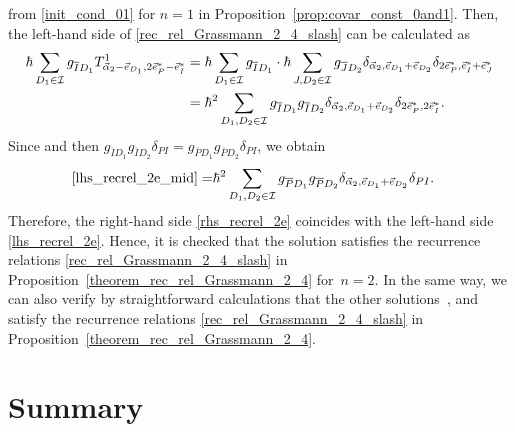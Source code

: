 \documentclass[10pt,a4paper]{amsart}
\numberwithin{equation}{section}
\begin{document}
from \eqref{init_cond_01} for $n=1$ in Proposition~\ref{prop:covar_const_0and1}. Then, the left-hand side of \eqref{rec_rel_Grassmann_2_4_slash} can be calculated as
\begin{align}
\hbar
\sum_{
D_{1}
\in
\mathcal{I}
}
g_{\overline{I}
D_{1}
}
T^{1}_{
\vec{\alpha}_{2}
-
\vec{e}_{D_{1}}
,
2
\vec{e}_{P}^{\ast}
-
\vec{e}_{I}^{\ast}
}
={}&
\hbar
\sum_{
D_{1}
\in
\mathcal{I}
}
g_{\overline{I}D_{1}}
\cdot
\hbar
\sum_{
J,D_{2}
\in
\mathcal{I}
}
g_{\overline{J}D_{2}}
\delta_{
\vec{\alpha}_{2},
\vec{e}_{D_{1}}
+
\vec{e}_{D_{2}}
}
\delta_{
2
\vec{e}_{P}^{\ast},
\vec{e}_{I}^{\ast}
+
\vec{e}_{J}^{\ast}
}
\nonumber
\\
={}&
\hbar^{2}
\sum_{
D_{1},D_{2}
\in
\mathcal{I}
}
g_{\overline{I}D_{1}}
g_{\overline{I}D_{2}}
\delta_{
\vec{\alpha}_{2},
\vec{e}_{D_{1}}
+
\vec{e}_{D_{2}}
}
\delta_{
2
\vec{e}_{P}^{\ast},
2
\vec{e}_{I}^{\ast}
}
.
\label{lhs_recrel_2e_mid}
\end{align}
Since
and then
$
g_{\overline{I}D_{1}}
g_{\overline{I}D_{2}}
\delta_{PI}
=
g_{\overline{P}D_{1}}
g_{\overline{P}D_{2}}
\delta_{PI}
$,
we obtain
\begin{align}
\eqref{lhs_recrel_2e_mid}
=&
\hbar^{2}
\sum_{
D_{1},D_{2}
\in
\mathcal{I}
}
g_{\overline{P}D_{1}}
g_{\overline{P}D_{2}}
\delta_{
\vec{\alpha}_{2},
\vec{e}_{D_{1}}
+
\vec{e}_{D_{2}}
}
\delta_{PI}.
\label{lhs_recrel_2e}
\end{align}
Therefore, the right-hand side \eqref{rhs_recrel_2e} coincides with the left-hand side \eqref{lhs_recrel_2e}. Hence, it is checked that the solution
satisfies the recurrence relations \eqref{rec_rel_Grassmann_2_4_slash} in
Proposition~\ref{theorem_rec_rel_Grassmann_2_4} for~${n=2}$. In the same way, we can also verify by straightforward calculations that the other solutions~,
and
satisfy the recurrence relations \eqref{rec_rel_Grassmann_2_4_slash} in
Proposition~\ref{theorem_rec_rel_Grassmann_2_4}.


\section{Summary}\label{G24_summary}
\end{document}

